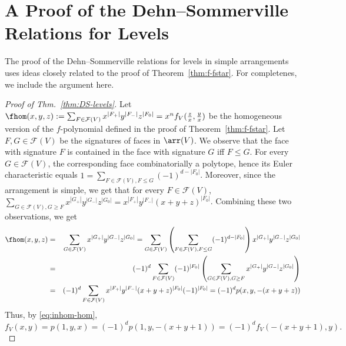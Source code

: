 \section{A Proof of the Dehn--Sommerville Relations for Levels}
\label{app_proof-DS}
The proof of the Dehn--Sommerville relations for levels in simple arrangements uses ideas closely related to the proof of Theorem~\ref{thm:f-fstar}. For completenes, we include the argument here.
%
\begin{proof}[Proof of Thm.~\ref{thm:DS-levels}]
Let $\fhom(x,y,z):=\sum_{F\in \mathcal{F}(V)} x^{|F_+|}y^{|F_-|}z^{|F_0|}=x^n f_V(\frac{z}{x},\frac{y}{x})$ be the homogeneous version of the $f$-polynomial defined in the proof of Theorem~\ref{thm:f-fstar}. 
%
Let $F,G \in \mathcal{F}(V)$ be the signatures of faces in $\arr(V)$. We observe that the face with signature $F$ is contained in the face with signature $G$ iff $F\leq G$.
%
For every $G \in \mathcal{F}(V)$, the corresponding face combinatorially a polytope, hence its Euler characteristic equals 
$1=\sum_{F\in \mathcal{F}(V), F\leq G} (-1)^{d-|F_0|}$.
Moreover, since the arrangement is simple, we get that for every $F\in \mathcal{F}(V)$,
$
\sum_{G\in \mathcal{F}(V), G\geq F} x^{|G_+|} y^{|G_-|} z^{|G_0|}=x^{|F_+|} y^{|F_-|}(x+y+z)^{|F_0|}
$.
Combining these two observations, we get
\begin{eqnarray*}
\fhom(x,y,z) & = & \sum_{G\in \mathcal{F}(V)}x^{|G_+|} y^{|G_-|} z^{|G_0|} = \sum_{G\in \mathcal{F}(V)}\left(\sum_{F\in \mathcal{F}(V), F\leq G} (-1)^{d-|F_0|}\right)x^{|G_+|} y^{|G_-|}z^{|G_0|}\\
& = & (-1)^d \sum_{F\in \mathcal{F}(V)} (-1)^{|F_0|} \left( \sum_{G\in \mathcal{F}(V), G\geq F} x^{|G_+|} y^{|G_-|}z^{|G_0|}
\right)\\
& = & (-1)^d \sum_{F\in \mathcal{F}(V)} x^{|F_+|} y^{|F_-|}(x+y+z)^{|F_0|}(-1)^{|F_0|} = (-1)^d p(x,y,-(x+y+z))
\end{eqnarray*}
Thus, by \eqref{eq:inhom-hom}, 
$
f_V(x,y)=p(1,y,x)=(-1)^d p(1,y,-(x+y+1))=(-1)^d f_V(-(x+y+1),y).
$
\end{proof}
%
